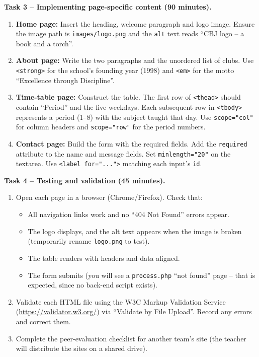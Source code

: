 \documentclass[11pt]{article}
\begin{document}
\textbf{Task 3 -- Implementing page-specific content (90 minutes).}
\begin{enumerate}
  \item \textbf{Home page:} Insert the heading, welcome paragraph and logo image. Ensure the image path is \texttt{images/logo.png} and the \texttt{alt} text reads ``CBJ logo -- a book and a torch''.
  \item \textbf{About page:} Write the two paragraphs and the unordered list of clubs. Use \texttt{<strong>} for the school's founding year (1998) and \texttt{<em>} for the motto ``Excellence through Discipline''.
  \item \textbf{Time-table page:} Construct the table. The first row of \texttt{<thead>} should contain ``Period'' and the five weekdays. Each subsequent row in \texttt{<tbody>} represents a period (1--8) with the subject taught that day. Use \texttt{scope="col"} for column headers and \texttt{scope="row"} for the period numbers.
  \item \textbf{Contact page:} Build the form with the required fields. Add the \texttt{required} attribute to the name and message fields. Set \texttt{minlength="20"} on the textarea. Use \texttt{<label for="...">} matching each input's \texttt{id}.
\end{enumerate}

\textbf{Task 4 -- Testing and validation (45 minutes).}
\begin{enumerate}
  \item Open each page in a browser (Chrome/Firefox). Check that:
        \begin{itemize}
          \item All navigation links work and no ``404 Not Found'' errors appear.
          \item The logo displays, and the alt text appears when the image is broken (temporarily rename \texttt{logo.png} to test).
          \item The table renders with headers and data aligned.
          \item The form submits (you will see a \texttt{process.php} ``not found'' page -- that is expected, since no back-end script exists).
        \end{itemize}
  \item Validate each HTML file using the W3C Markup Validation Service (\url{https://validator.w3.org/}) via ``Validate by File Upload''. Record any errors and correct them.
  \item Complete the peer-evaluation checklist for another team's site (the teacher will distribute the sites on a shared drive).
\end{enumerate}
\end{document}
